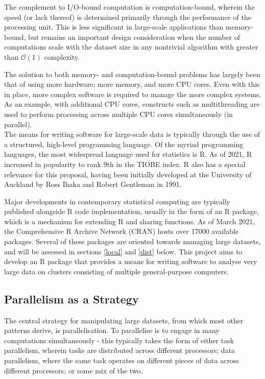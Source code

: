The complement to I/O-bound computation is computation-bound, wherein the speed (or lack thereof) is determined primarily through the performance of the processing unit. This is less significant in large-scale applications than memory-bound, but remains an important design consideration when the number of computations scale with the dataset size in any nontrivial algorithm with greater than \(\mathcal{O}(1)\) complexity.

The solution to both memory- and computation-bound problems has largely been that of using more hardware; more memory, and more CPU cores. Even with this in place, more complex software is required to manage the more complex systems. As an example, with additional CPU cores, constructs such as multithreading are used to perform processing across multiple CPU cores simultaneously (in parallel).\\

The means for writing software for large-scale data is typically through the use of a structured, high-level programming language.
Of the myriad programming languages, the most widespread language used for statistics is R.
As of 2021, R increased in popularity to rank 9th in the TIOBE index.
R also has a special relevance for this proposal, having been initially developed at the University of Auckland by Ross Ihaka and Robert Gentleman in 1991\cite{ihaka1996r}.

Major developments in contemporary statistical computing are typically published alongside R code implementation, usually in the form of an R package, which is a mechanism for extending R and sharing functions.
As of March 2021, the Comprehensive R Archive Network (CRAN) hosts over 17000 available packages\cite{team20:_r}.
Several of these packages are oriented towards managing large datasets, and will be assessed in sections \ref{local} and \ref{dist}  below.
This project aims to develop an R package that provides a means for writing software to analyse very large data on clusters consisting of multiple general-purpose computers.

\subsection{Parallelism as a Strategy}
\label{parallel}
The central strategy for manipulating large datasets, from which most other patterns derive, is parallelisation. To parallelise is to engage in many computations simultaneously - this typically takes the form of either task parallelism, wherein tasks are distributed across different processors; data parallelism, where the same task operates on different pieces of data across different processors; or some mix of the two.

